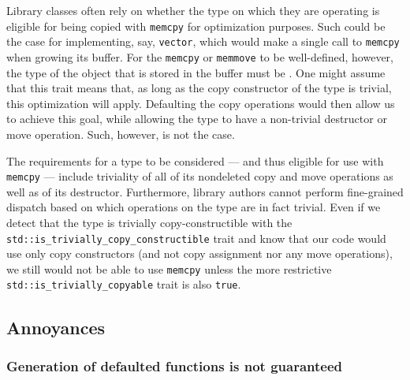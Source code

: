 Library classes often rely on whether the type on which they are operating is eligible for being copied with \lstinline!memcpy! for optimization purposes.  Such could be the case for implementing, say, \lstinline!vector!, which would make a single call to \lstinline!memcpy! when growing its buffer.  For the \lstinline!memcpy! or \lstinline!memmove! to be well-defined, however, the type of the object that is stored in the buffer must be .  One might assume that this trait means that, as long as the copy constructor of the type is trivial, this optimization will apply.  Defaulting the copy operations would then allow us to achieve this goal, while allowing the type to have a non-trivial destructor or move operation.  Such, however, is not the case.

The requirements for a type to be considered  --- and thus eligible for use with \lstinline!memcpy! --- include triviality of all of its nondeleted copy and move operations as well as of its destructor.  Furthermore, library authors cannot perform fine-grained dispatch based on which operations on the type are in fact trivial.  Even if we detect that the type is trivially copy-constructible with the \lstinline!std::is_trivially_copy_constructible! trait and know that our code would use only copy constructors (and not copy assignment nor any move operations), we still would not be able to use \lstinline!memcpy! unless the more restrictive \lstinline!std::is_trivially_copyable! trait is also \lstinline!true!.

\subsection{Annoyances}

\subsubsection[Generation of defaulted functions is not guaranteed]{Generation of defaulted functions is not guaranteed}\label{generation-of-defaulted-functions-is-not-guaranteed}

